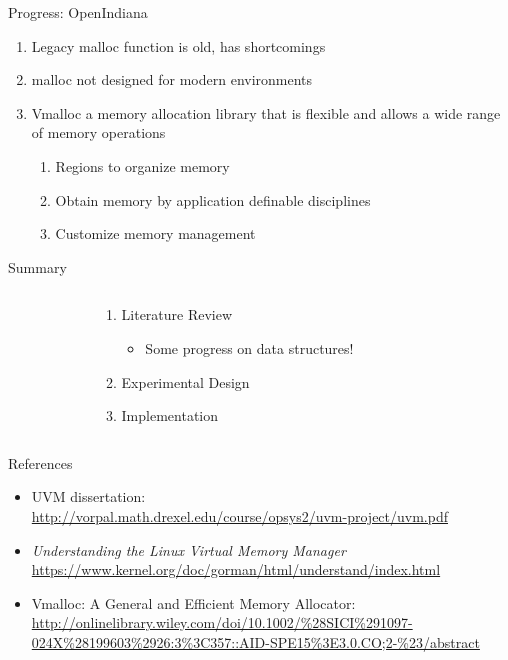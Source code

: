 \documentclass[aspectratio=169]{beamer}
\newcommand{\bi}{\begin{itemize}}
\newcommand{\ei}{\end{itemize}}
\newcommand{\bn}{\begin{enumerate}}
\newcommand{\en}{\end{enumerate}}
\begin{document}
\begin{frame}{Progress: OpenIndiana}
    \begin{enumerate}
        \item Legacy malloc function is old, has shortcomings
        \item malloc not designed for modern environments
        \item Vmalloc a memory allocation library that is flexible and allows a
            wide range of memory operations
            \begin{enumerate}
                \item Regions to organize memory
                \item Obtain memory by application definable disciplines
                \item Customize memory management
            \end{enumerate}
    \end{enumerate}
\end{frame}

\begin{frame}{Summary}
  \begin{columns}[T]
    \begin{column}{0.2\textwidth}
    \end{column}
    \begin{column}{0.6\textwidth}
      \bn
    \item Literature Review
      \bi
    \item Some progress on data structures!
      \ei
    \item Experimental Design
    \item Implementation
      \en
    \end{column}
    \begin{column}{0.2\textwidth}
    \end{column}
  \end{columns}
\end{frame}

\begin{frame}[noframenumbering]{References}
  \small
  \bi
\item UVM dissertation:\\
  \url{http://vorpal.math.drexel.edu/course/opsys2/uvm-project/uvm.pdf}
\item \textsl{Understanding the Linux Virtual Memory Manager}\\
  \url{https://www.kernel.org/doc/gorman/html/understand/index.html}
  \ei
  \bi
  \item Vmalloc: A General and Efficient Memory Allocator:
      \url{http://onlinelibrary.wiley.com/doi/10.1002/\%28SICI\%291097-024X\%28199603\%2926:3\%3C357::AID-SPE15\%3E3.0.CO;2-\%23/abstract}
\ei
\end{frame}
\end{document}
